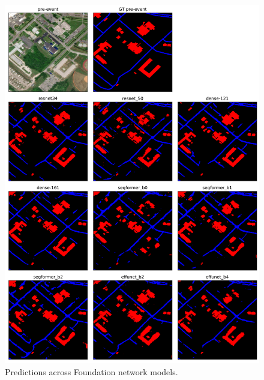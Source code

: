 \documentclass[10pt,twocolumn,letterpaper]{article}
\begin{document}
\clearpage
\begin{figure}[t]
  \centering
   \includegraphics[width=2\linewidth]{final-report/figures/sample_images_foundation_2.png}
   \caption{Predictions across Foundation network models.}
   \label{fig:sample_images_foundation_2}
\end{figure}
\end{document}

